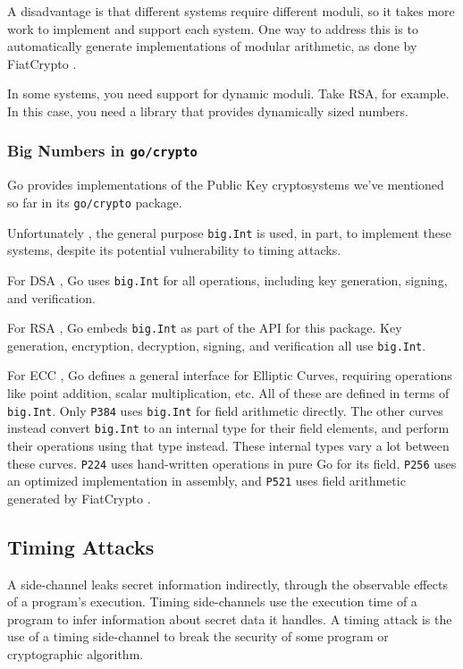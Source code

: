 \documentclass[11pt, a4paper]{article} %
\begin{document}
{A disadvantage is that different systems require different moduli,
so it takes more work to implement and support each system.
One way to address this is to automatically generate implementations
of modular arithmetic, as done by FiatCrypto
\cite{hvass_high-assurance_nodate}.

In some systems, you need support for dynamic moduli.
Take RSA, for example.
In this case, you need a library that provides
dynamically sized numbers.

\subsubsection{Big Numbers in \texttt{go/crypto}}

Go provides implementations of the Public Key cryptosystems
we've mentioned so far in its \texttt{go/crypto} package.

Unfortunately \cite{ford_proposal_2017}, the general purpose
\texttt{big.Int} is used, in part, to implement these systems,
despite its potential vulnerability to timing attacks.

For DSA \cite{technology_digital_1994}, Go uses \texttt{big.Int}
for all operations, including key generation, signing, and verification.

For RSA \cite{rivest_method_1978}, Go embeds \texttt{big.Int}
as part of the API for
this package. Key generation, encryption, decryption, signing,
and verification all use \texttt{big.Int}.

For ECC \cite{miller_use_1986}, Go defines a general interface
for Elliptic Curves, requiring operations like point addition,
scalar multiplication, etc. All of these are defined in terms
of \texttt{big.Int}. Only \texttt{P384}
uses \texttt{big.Int} for field arithmetic directly. The other
curves instead convert \texttt{big.Int} to an internal
type for their field elements,
and perform their operations using that type instead. 
These internal types vary a lot between these curves.
\texttt{P224} uses hand-written operations in pure Go
for its field,
\texttt{P256} uses an optimized implementation in assembly,
and \texttt{P521} uses field arithmetic generated
by FiatCrypto
\cite{hvass_high-assurance_nodate}.

\subsection{Timing Attacks}

A side-channel
\cite{kelsey_side_1998}
leaks secret information indirectly,
through the observable effects of a program's execution.
Timing side-channels use the execution time of a program
to infer information about secret data it handles. 
A timing attack is the use of a timing side-channel to break the security
of some program or cryptographic algorithm.

}
\end{document}
